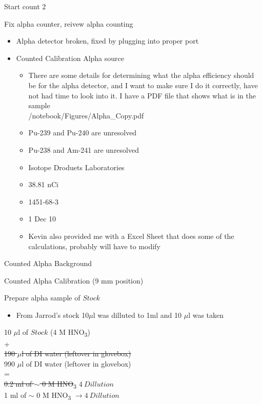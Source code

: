 \documentclass[idxtotoc,hyperref,openany,oneside]{labbook} %
\newcommand{\cmark}{\ding{51}}%
\newcommand{\done}{\rlap{$\square$}{\raisebox{2pt}{\large\hspace{1pt}\cmark}}%
  \hspace{-2.5pt}}
\newcommand{\tsbs}{\textsubscript}
\begin{document}
\begin{todolist}
\item[\done]{Start count $\boxed{2}$}
\item[\done]{Fix alpha counter, reivew alpha counting}
  \begin{itemize}
  \item{Alpha detector broken, fixed by plugging into proper port}
  \item{Counted Calibration Alpha source}
    \begin{itemize}
    \item{There are some details for determining
      what the alpha efficiency should be for the alpha
      detector, and I want to make sure I do it correctly,
      have not had time to look into it. I have a PDF file
      that shows what is in the sample\\
      /notebook/Figures/Alpha\_Copy.pdf}
    \item{Pu-239 and Pu-240 are unresolved}
    \item{Pu-238 and Am-241 are unresolved}
    \item{Isotope Droduets Laboratories}
    \item{38.81 nCi}
    \item{1451-68-3}
    \item{1 Dec 10}
    \item{Kevin also provided me with a Excel Sheet that does
      some of the calculations, probably will have to modify}
    \end{itemize}
  \end{itemize}
\item[\done]{Counted Alpha Background}
\item[\done]{Counted Alpha Calibration (9 mm position)}
\item[\done]{Prepare alpha sample of $\boxed{Stock}$}
  \begin{itemize}
    \item{From Jarrod's stock 10$\mu$l was dilluted to 1ml
    and 10 $\mu$l was taken}
  \end{itemize}
\end{todolist}
\begin{center}
10 $\mu$l of $\boxed{Stock}$ (4 M HNO\tsbs{3})\\
+\\
\st{190 $\mu$l of DI water (leftover in glovebox)}\\
990 $\mu$l of DI water (leftover in glovebox)\\
=\\
\st{0.2 ml of $\sim$ 0 M HNO}\tsbs{3}\st{ $\boxed{4\ Dillution}$}\\
1 ml of $\sim$ 0 M HNO\tsbs{3} $\rightarrow\boxed{4\ Dillution}$
\end{center}
\end{document}
